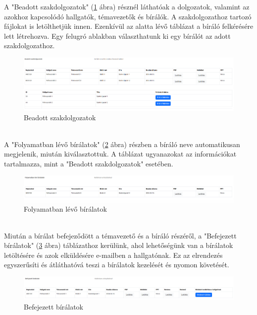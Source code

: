 A "Beadott szakdolgozatok" (\ref{fig:Report_status1} ábra) résznél láthatóak a dolgozatok, valamint az azokhoz kapcsolódó hallgatók, témavezetők és bírálók. A szakdolgozathoz tartozó fájlokat is letölthetjük innen. Ezenkívül az alatta lévő táblázat a bíráló felkérésére lett létrehozva. Egy felugró ablakban választhatunk ki egy bírálót az adott szakdolgozathoz.\\
\begin{figure}[h!]
\centering
\includegraphics[width=\textwidth]{images/Report_status1.png}
\caption{Beadott szakdolgozatok}
\label{fig:Report_status1}
\end{figure}
\\A "Folyamatban lévő bírálatok" (\ref{fig:Report_status2} ábra) részben a bíráló neve automatikusan megjelenik, miután kiválasztottuk. A táblázat ugyanazokat az információkat tartalmazza, mint a "Beadott szakdolgozatok" esetében.\\
\begin{figure}[h!]
\centering
\includegraphics[width=\textwidth]{images/Report_status2.png}
\caption{Folyamatban lévő bírálatok}
\label{fig:Report_status2}
\end{figure}
\\Miután a bírálat befejeződött a témavezető és a bíráló részéről, a "Befejezett bírálatok" (\ref{fig:Report_status3} ábra) táblázathoz kerülünk, ahol lehetőségünk van a bírálatok letöltésére és azok elküldésére e-mailben a hallgatónak. Ez az elrendezés egyszerűsíti és átláthatóvá teszi a bírálatok kezelését és nyomon követését.
\begin{figure}[h!]
\centering
\includegraphics[width=\textwidth]{images/Report_status3.png}
\caption{Befejezett bírálatok}
\label{fig:Report_status3}
\end{figure}

